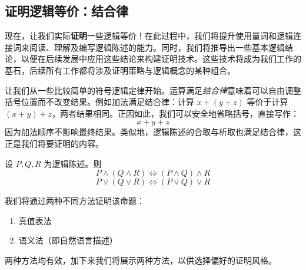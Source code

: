 \subsection{证明逻辑等价：结合律}

现在，让我们实际\textbf{证明}一些逻辑等价！在此过程中，我们将提升使用量词和逻辑连接词来阅读、理解及编写逻辑陈述的能力。同时，我们将推导出一些基本逻辑结论，以便在后续发展中应用这些结论来构建证明技术。这些技术将成为我们工作的基石，后续所有工作都将涉及证明策略与逻辑概念的某种组合。

让我们从一些比较简单的符号逻辑定律开始。运算满足\emph{结合律}意味着可以自由调整括号位置而不改变结果。例如加法满足结合律：计算 $x + (y + z)$ 等价于计算 $(x + y) + z$，两者结果相同。正因如此，我们可以安全地省略括号，直接写作：
\[x + y + z\]
因为加法顺序不影响最终结果。类似地，逻辑陈述的合取与析取也满足结合律，这正是我们将要证明的内容。

\begin{theorem}
    设 $P, Q, R$ 为逻辑陈述。则
    \[P \land (Q \land R) \iff (P \land Q) \land R\]
    \[P \lor (Q \lor R) \iff (P \lor Q) \lor R\]
\end{theorem}

我们将通过两种不同方法证明该命题：
\begin{enumerate}[label=(\arabic*)]
    \item 真值表法
    \item 语义法（即自然语言描述）
\end{enumerate}
两种方法均有效，加下来我们将展示两种方法，以供选择偏好的证明风格。

